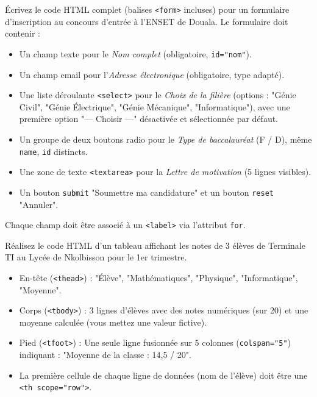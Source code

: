 \documentclass[11pt]{article}
\newcounter{popsec}
\newcounter{popsub}
\newcommand{\courssub}[1]{%
  \stepcounter{popsub}%
  \par\vspace{9pt}\noindent{\popxbold\fontsize{11.5}{13}\selectfont\color{popink}{\color{poporange}\thepopsec.\thepopsub}\hspace{6pt}#1}\par\nopagebreak\vspace{4pt}
}
\begin{document}
\courssub{Je m'entraîne}

\begin{exercice}
Écrivez le code HTML complet (balises \texttt{<form>} incluses) pour un formulaire d'inscription au concours d'entrée à l'ENSET de Douala. Le formulaire doit contenir :
\begin{itemize}
    \item Un champ texte pour le \emph{Nom complet} (obligatoire, \texttt{id="nom"}).
    \item Un champ email pour l'\emph{Adresse électronique} (obligatoire, type adapté).
    \item Une liste déroulante \texttt{<select>} pour le \emph{Choix de la filière} (options : "Génie Civil", "Génie Électrique", "Génie Mécanique", "Informatique"), avec une première option "--- Choisir ---" désactivée et sélectionnée par défaut.
    \item Un groupe de deux boutons radio pour le \emph{Type de baccalauréat} (F / D), même \texttt{name}, \texttt{id} distincts.
    \item Une zone de texte \texttt{<textarea>} pour la \emph{Lettre de motivation} (5 lignes visibles).
    \item Un bouton \texttt{submit} "Soumettre ma candidature" et un bouton \texttt{reset} "Annuler".
\end{itemize}
Chaque champ doit être associé à un \texttt{<label>} via l'attribut \texttt{for}.
\end{exercice}

\begin{exercice}
Réalisez le code HTML d'un tableau affichant les notes de 3 élèves de Terminale TI au Lycée de Nkolbisson pour le 1er trimestre.
\begin{itemize}
    \item En-tête (\texttt{<thead>}) : "Élève", "Mathématiques", "Physique", "Informatique", "Moyenne".
    \item Corps (\texttt{<tbody>}) : 3 lignes d'élèves avec des notes numériques (sur 20) et une moyenne calculée (vous mettez une valeur fictive).
    \item Pied (\texttt{<tfoot>}) : Une seule ligne fusionnée sur 5 colonnes (\texttt{colspan="5"}) indiquant : "Moyenne de la classe : 14,5 / 20".
    \item La première cellule de chaque ligne de données (nom de l'élève) doit être une \texttt{<th scope="row">}.
\end{itemize}
\end{exercice}
\end{document}

